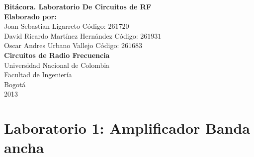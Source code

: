 \documentclass[11pt,graphicx,caption,rotating]{article}
\begin{document}
\begin{titlepage}
\begin{center}
{\huge \textbf{Bitácora. Laboratorio De Circuitos de RF}}\\[6cm]
{\Large \textbf{Elaborado por:}}\\
{\Large Joan Sebastian Ligarreto Código: $261720$}\\
{\Large David Ricardo Martínez Hernández Código: $261931$}\\
{\Large Oscar Andres Urbano Vallejo Código: $261683$}\\[7cm]
{\Large \textbf{Circuitos de Radio Frecuencia}}\\[6cm]
{\Large Universidad Nacional de Colombia}\\
{\Large Facultad de Ingeniería}\\
{\Large Bogotá}\\
{\Large 2013}\\
\date{}
\end{center}
\end{titlepage}
\tableofcontents
\listoftables
\listoffigures

\newpage


\section{Laboratorio 1: Amplificador Banda ancha}
\end{document}
